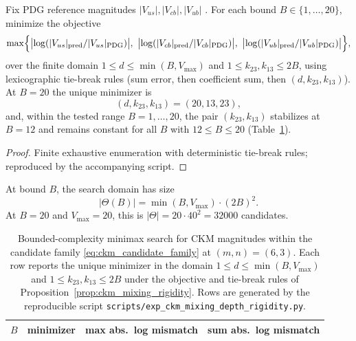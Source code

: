\begin{proposition}\label{prop:ckm_mixing_rigidity}
Fix PDG reference magnitudes $|V_{us}|,|V_{cb}|,|V_{ub}|$ \cite{PDGRPP2024}.
For each bound $B\in\{1,\dots,20\}$, minimize the objective
\[
\max\Bigl\{\bigl|\log(|V_{us}|_{\mathrm{pred}}/|V_{us}|_{\mathrm{PDG}})\bigr|,
\ \bigl|\log(|V_{cb}|_{\mathrm{pred}}/|V_{cb}|_{\mathrm{PDG}})\bigr|,
\ \bigl|\log(|V_{ub}|_{\mathrm{pred}}/|V_{ub}|_{\mathrm{PDG}})\bigr|\Bigr\},
\]
over the finite domain $1\le d\le \min(B,V_{\max})$ and $1\le k_{23},k_{13}\le 2B$, using lexicographic tie-break rules (sum error, then coefficient sum, then $(d,k_{23},k_{13})$).
At $B=20$ the unique minimizer is
\[
(d,k_{23},k_{13})=(20,13,23),
\]
and, within the tested range $B=1,\dots,20$, the pair $(k_{23},k_{13})$ stabilizes at $B=12$ and remains constant for all $B$ with $12\le B\le 20$ (Table~\ref{tab:ckm_mixing_rigidity}).
\end{proposition}
\begin{proof}
Finite exhaustive enumeration with deterministic tie-break rules; reproduced by the accompanying script.
\end{proof}

\begin{remark}\label{rem:ckm_domain_size}
At bound $B$, the search domain has size
\[
|\Theta(B)|=\min(B,V_{\max})\cdot (2B)^2.
\]
At $B=20$ and $V_{\max}=20$, this is $|\Theta|=20\cdot 40^2=32000$ candidates.
\end{remark}

\begin{table}[t]
\centering
\small
\setlength{\tabcolsep}{6pt}
\renewcommand{\arraystretch}{1.15}
\begin{tabular}{rllr}
\toprule
$B$ & minimizer & max abs.\ log mismatch & sum abs.\ log mismatch \\
\midrule
%
\end{tabular}
\caption{Bounded-complexity minimax search for CKM magnitudes within the candidate family \eqref{eq:ckm_candidate_family} at $(m,n)=(6,3)$. Each row reports the unique minimizer in the domain $1\le d\le\min(B,V_{\max})$ and $1\le k_{23},k_{13}\le 2B$ under the objective and tie-break rules of Proposition~\ref{prop:ckm_mixing_rigidity}. Rows are generated by the reproducible script \texttt{scripts/exp\_ckm\_mixing\_depth\_rigidity.py}.}
\label{tab:ckm_mixing_rigidity}
\end{table}

